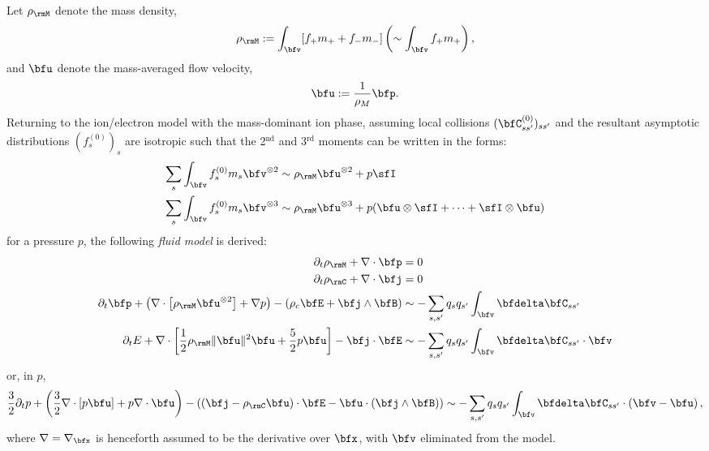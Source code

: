     Let $\rho_{\rmM}$ denote the mass density,
    \begin{equation}
        \rho_{\rmM}  :=  \int_{\bfv}[f_{+}m_{+} + f_{-}m_{-}]  \left(\sim  \int_{\bfv}f_{+}m_{+}\right),
    \end{equation}
    and $\bfu$ denote the mass-averaged flow velocity,
    \begin{equation}
        \bfu  :=  \frac{1}{\rho_{M}}\bfp.
    \end{equation}
    Returning to the ion/electron model with the mass-dominant ion phase, assuming local collisions $(\bfC_{ss'}^{(0)})_{ss'}$ and the resultant asymptotic distributions $(f_{s}^{(0)})_{s}$ are isotropic such that the 2$^{\text{nd}}$ and 3$^{\text{rd}}$ moments can be written in the forms:
    \begin{align}
        \sum_{s}\int_{\bfv}f_{s}^{(0)}m_{s}\bfv^{\otimes 2}  &\sim  \rho_{\rmM}\bfu^{\otimes 2} + p\sfI  \\
        \sum_{s}\int_{\bfv}f_{s}^{(0)}m_{s}\bfv^{\otimes 3}  &\sim  \rho_{\rmM}\bfu^{\otimes 3} + p(\bfu\otimes\sfI + \cdots + \sfI\otimes\bfu)
    \end{align}
    for a pressure $p$, the following \emph{fluid model} is derived:
    \begin{align}
        \partial_{t}\rho_{\rmM} + \nabla\cdot\bfp  &=  0  \\
        \partial_{t}\rho_{\rmC} + \nabla\cdot\bfj  &=  0  \\
        \partial_{t}\bfp + \left(\nabla\cdot\left[\rho_{\rmM}\bfu^{\otimes 2}\right] + \nabla p\right) - \left(\rho_{c}\bfE + \bfj\wedge\bfB\right)  &\sim  - \sum_{s, s'}q_{s}q_{s'}\int_{\bfv}\bfdelta\bfC_{ss'}  \\
        \partial_{t}E + \nabla\cdot\left[\frac{1}{2}\rho_{\rmM}\|\bfu\|^{2}\bfu + \frac{5}{2}p\bfu\right] - \bfj\cdot\bfE  &\sim  - \sum_{s, s'}q_{s}q_{s'}\int_{\bfv}\bfdelta\bfC_{ss'}\cdot\bfv
    \end{align}
    or, in $p$,
    \begin{equation}
        \frac{3}{2}\partial_{t}p + \left(\frac{3}{2}\nabla\cdot[p\bfu] + p\nabla\cdot\bfu\right) - ((\bfj - \rho_{\rmC}\bfu)\cdot\bfE - \bfu\cdot(\bfj\wedge\bfB))  \sim  - \sum_{s, s'}q_{s}q_{s'}\int_{\bfv}\bfdelta\bfC_{ss'}\cdot\left(\bfv - \bfu\right),
    \end{equation}
    where $\nabla  =  \nabla_{\bfx}$ is henceforth assumed to be the derivative over $\bfx$, with $\bfv$ eliminated from the model.
    